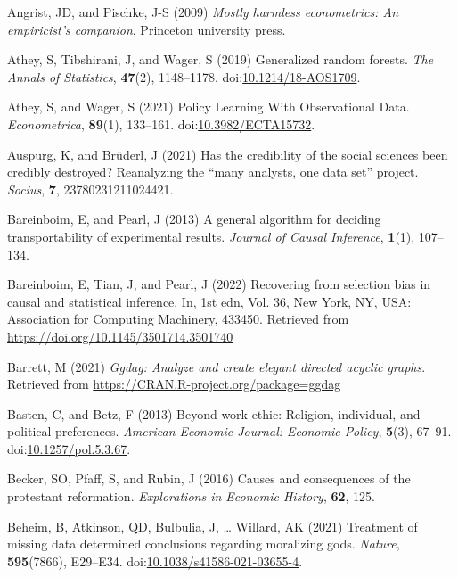 \documentclass[
  singlecolumn]{article}
\newlength{\cslhangindent}
\newenvironment{CSLReferences}[2] %
 {\begin{list}{}{%
  \setlength{\itemindent}{0pt}
  \setlength{\leftmargin}{0pt}
  \setlength{\parsep}{0pt}
  \ifodd #1
   \setlength{\leftmargin}{\cslhangindent}
   \setlength{\itemindent}{-1\cslhangindent}
  \fi
  \setlength{\itemsep}{#2\baselineskip}}}
 {\end{list}}
\begin{document}
\label{refs}
\begin{CSLReferences}{1}{0}
Angrist, JD, and Pischke, J-S (2009) \emph{Mostly harmless econometrics:
An empiricist's companion}, Princeton university press.

Athey, S, Tibshirani, J, and Wager, S (2019) Generalized random forests.
\emph{The Annals of Statistics}, \textbf{47}(2), 1148--1178.
doi:\href{https://doi.org/10.1214/18-AOS1709}{10.1214/18-AOS1709}.

Athey, S, and Wager, S (2021) Policy Learning With Observational Data.
\emph{Econometrica}, \textbf{89}(1), 133--161.
doi:\href{https://doi.org/10.3982/ECTA15732}{10.3982/ECTA15732}.

Auspurg, K, and Brüderl, J (2021) Has the credibility of the social
sciences been credibly destroyed? Reanalyzing the {``many analysts, one
data set''} project. \emph{Socius}, \textbf{7}, 23780231211024421.

Bareinboim, E, and Pearl, J (2013) A general algorithm for deciding
transportability of experimental results. \emph{Journal of Causal
Inference}, \textbf{1}(1), 107--134.

Bareinboim, E, Tian, J, and Pearl, J (2022) Recovering from selection
bias in causal and statistical inference. In, 1st edn, Vol. 36, New
York, NY, USA: Association for Computing Machinery, 433450. Retrieved
from \url{https://doi.org/10.1145/3501714.3501740}

Barrett, M (2021) \emph{Ggdag: Analyze and create elegant directed
acyclic graphs}. Retrieved from
\url{https://CRAN.R-project.org/package=ggdag}

Basten, C, and Betz, F (2013) Beyond work ethic: Religion, individual,
and political preferences. \emph{American Economic Journal: Economic
Policy}, \textbf{5}(3), 67--91.
doi:\href{https://doi.org/10.1257/pol.5.3.67}{10.1257/pol.5.3.67}.

Becker, SO, Pfaff, S, and Rubin, J (2016) Causes and consequences of the
protestant reformation. \emph{Explorations in Economic History},
\textbf{62}, 125.

Beheim, B, Atkinson, QD, Bulbulia, J, \ldots{} Willard, AK (2021)
Treatment of missing data determined conclusions regarding moralizing
gods. \emph{Nature}, \textbf{595}(7866), E29--E34.
doi:\href{https://doi.org/10.1038/s41586-021-03655-4}{10.1038/s41586-021-03655-4}.


\end{CSLReferences}
\end{document}

